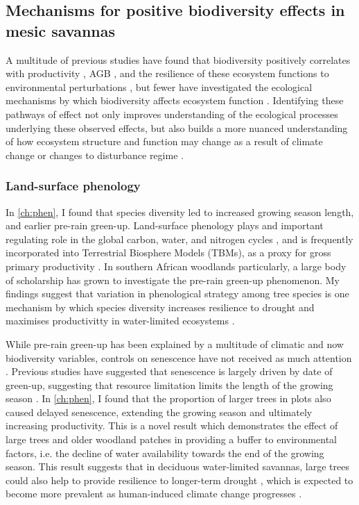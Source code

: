 \begin{refsection}
\subsection{Mechanisms for positive biodiversity effects in mesic savannas}
\label{discussion:ssec:mechanism}

A multitude of previous studies have found that biodiversity positively correlates with productivity \citep{}, AGB \citep{}, and the resilience of these ecosystem functions to environmental perturbations \citep{}, but fewer have investigated the ecological mechanisms by which biodiversity affects ecosystem function \citep{}. Identifying these pathways of effect not only improves understanding of the ecological processes underlying these observed effects, but also builds a more nuanced understanding of how ecosystem structure and function may change as a result of climate change or changes to disturbance regime \citep{}.

\subsubsection{Land-surface phenology}
\label{discussion:sssec:phen}

In \autoref{ch:phen}, I found that species diversity led to increased growing season length, and earlier pre-rain green-up. Land-surface phenology plays and important regulating role in the global carbon, water, and nitrogen cycles \citep{Richardson2013}, and is frequently incorporated into Terrestrial Biosphere Models (TBMs), as a proxy for gross primary productivity \citep{Bloom2016}. In southern African woodlands particularly, a large body of scholarship has grown to investigate the pre-rain green-up phenomenon. My findings suggest that variation in phenological strategy among tree species is one mechanism by which species diversity increases resilience to drought and maximises productivitty in water-limited ecosystems \citep{Stan2019, Morellato2016}. 

While pre-rain green-up has been explained by a multitude of climatic and now biodiversity variables, controls on senescence have not received as much attention \citep{}. Previous studies have suggested that senescence is largely driven by date of green-up, suggesting that resource limitation limits the length of the growing season \citep{Ryan}. In \autoref{ch:phen}, I found that the proportion of larger trees in plots also caused delayed senescence, extending the growing season and ultimately increasing productivity. This is a novel result which demonstrates the effect of large trees and older woodland patches in providing a buffer to environmental factors, i.e. the decline of water availability towards the end of the growing season. This result suggests that in deciduous water-limited savannas, large trees could also help to provide resilience to longer-term drought \citep{}, which is expected to become more prevalent as human-induced climate change progresses \citep{}.


\end{refsection}
